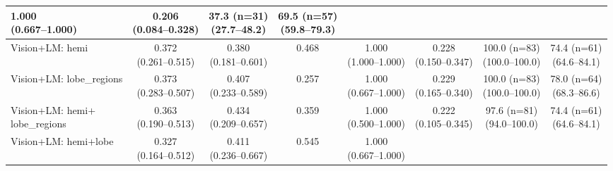 \documentclass[FCD_GNN.tex]{subfiles}
\begin{document}
\begin{table}[H]
\begin{threeparttable}
\begin{tabular}{lccccccc}
    \makecell{1.000\\(0.667--1.000)} &
    \makecell{0.206\\ (0.084--0.328)} &
    \makecell{37.3 (n=31) \\ (27.7--48.2)} &
    \makecell{69.5 (n=57) \\ (59.8--79.3)} \\
    \hline
    Vision+LM: hemi  &
    \makecell{0.372\\(0.261--0.515)} &
    \makecell{0.380\\(0.181--0.601)} &
    \colorbox{cyan!15}{0.468} &
    \makecell{1.000\\(1.000--1.000)} &
    \makecell{0.228\\(0.150--0.347)} &
    \makecell{\colorbox{green!15}{100.0 (n=83)} \\ (100.0--100.0)} &
    \makecell{74.4 (n=61) \\ (64.6--84.1)} \\
    \hline
    Vision+LM: lobe\_regions  &
    \makecell{\colorbox{orange!15}{0.373}\\(0.283--0.507)} &
    \makecell{0.407\\(0.233--0.589)} &
    0.257 &
    \makecell{1.000\\(0.667--1.000)} &
    \makecell{\colorbox{orange!15}{0.229}\\(0.165--0.340)} &
    \makecell{\colorbox{green!15}{100.0 (n=83)} \\ (100.0--100.0)} &
    \makecell{\colorbox{cyan!15}{78.0 (n=64)} \\ (68.3--86.6)} \\
    \hline
    Vision+LM: \makecell{hemi+\\lobe\_regions}  &
    \makecell{0.363\\(0.190--0.513)} &
    \makecell{0.434\\(0.209--0.657)} &
    0.359 &
    \makecell{1.000\\(0.500--1.000)} &
    \makecell{0.222\\(0.105--0.345)} &
    \makecell{\colorbox{orange!15}{97.6 (n=81)} \\ (94.0--100.0)} &
    \makecell{74.4 (n=61) \\ (64.6--84.1)} \\
    \hline
    Vision+LM: hemi+lobe  &
    \makecell{0.327\\(0.164--0.512)} &
    \makecell{0.411\\(0.236--0.667)} &
    \colorbox{green!15}{0.545} &
    \makecell{1.000\\(0.667--1.000)} &

\end{tabular}
\end{threeparttable}
\end{table}
\end{document}
